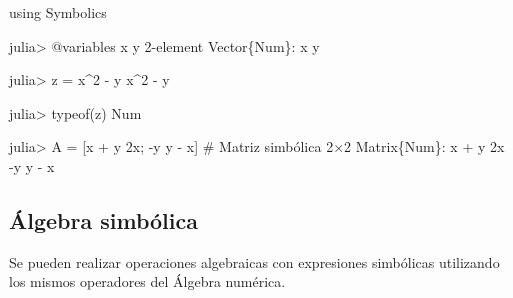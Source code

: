 \documentclass[
  letterpaper,
  DIV=11,
  numbers=noendperiod]{scrreprt}
\newenvironment{Shaded}{\begin{snugshade}}{\end{snugshade}}
\newcommand{\BuiltInTok}[1]{\textcolor[rgb]{0.00,0.23,0.31}{#1}}
\newcommand{\CommentTok}[1]{\textcolor[rgb]{0.37,0.37,0.37}{#1}}
\newcommand{\DataTypeTok}[1]{\textcolor[rgb]{0.68,0.00,0.00}{#1}}
\newcommand{\FloatTok}[1]{\textcolor[rgb]{0.68,0.00,0.00}{#1}}
\newcommand{\FunctionTok}[1]{\textcolor[rgb]{0.28,0.35,0.67}{#1}}
\newcommand{\ImportTok}[1]{\textcolor[rgb]{0.00,0.46,0.62}{#1}}
\newcommand{\NormalTok}[1]{\textcolor[rgb]{0.00,0.23,0.31}{#1}}
\newcommand{\OperatorTok}[1]{\textcolor[rgb]{0.37,0.37,0.37}{#1}}
\newcommand{\PreprocessorTok}[1]{\textcolor[rgb]{0.68,0.00,0.00}{#1}}
\begin{document}
\begin{Shaded}
\begin{Highlighting}[]
\ImportTok{using} \BuiltInTok{Symbolics}

\NormalTok{julia}\OperatorTok{\textgreater{}} \PreprocessorTok{@variables}\NormalTok{ x y}
\FloatTok{2}\OperatorTok{{-}}\NormalTok{element }\DataTypeTok{Vector}\NormalTok{\{Num\}}\OperatorTok{:}
\NormalTok{ x}
\NormalTok{ y}

\NormalTok{julia}\OperatorTok{\textgreater{}}\NormalTok{ z }\OperatorTok{=}\NormalTok{ x}\OperatorTok{\^{}}\FloatTok{2} \OperatorTok{{-}}\NormalTok{ y}
\NormalTok{x}\OperatorTok{\^{}}\FloatTok{2} \OperatorTok{{-}}\NormalTok{ y}

\NormalTok{julia}\OperatorTok{\textgreater{}} \FunctionTok{typeof}\NormalTok{(z)}
\NormalTok{Num}

\NormalTok{julia}\OperatorTok{\textgreater{}}\NormalTok{ A }\OperatorTok{=}\NormalTok{ [x }\OperatorTok{+}\NormalTok{ y }\FloatTok{2}\NormalTok{x; }\OperatorTok{{-}}\NormalTok{y y }\OperatorTok{{-}}\NormalTok{ x]  }\CommentTok{\# Matriz simbólica}
\FloatTok{2}\OperatorTok{×}\FloatTok{2} \DataTypeTok{Matrix}\NormalTok{\{Num\}}\OperatorTok{:}
\NormalTok{ x }\OperatorTok{+}\NormalTok{ y     }\FloatTok{2}\NormalTok{x}
    \OperatorTok{{-}}\NormalTok{y  y }\OperatorTok{{-}}\NormalTok{ x}
\end{Highlighting}
\end{Shaded}

\hypertarget{uxe1lgebra-simbuxf3lica}{%
\subsection{Álgebra simbólica}\label{uxe1lgebra-simbuxf3lica}}

Se pueden realizar operaciones algebraicas con expresiones simbólicas
utilizando los mismos operadores del Álgebra numérica.
\end{document}

